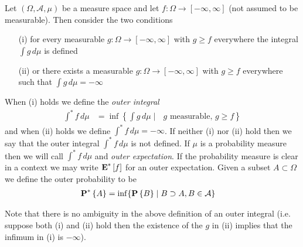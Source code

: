 \begin{defn}Let $(\Omega, \mathcal{A}, \mu)$ be a measure space and let $f : \Omega \to [-\infty, \infty]$ (not assumed to be measurable).  Then consider the two conditions
\begin{itemize}
\item [(i)] for every measurable $g : \Omega \to [-\infty, \infty]$ with $g \geq f$ everywhere the integral $\int g \, d\mu$ is defined 
\item [(ii)] or there exists a measurable $g : \Omega \to [-\infty, \infty]$  with $g \geq f$ everywhere such that $\int g \, d\mu = -\infty$ 
\end{itemize}
When (i) holds we define the \emph{outer integral}
\begin{align*}
\int^* {f} \, d\mu &= \inf \left \lbrace \int g  \, d\mu \mid \text{ $g$ measurable, } g \geq f \right \rbrace
\end{align*}
and when (ii) holds we define $\int^* f \, d\mu = -\infty$.
If neither (i) nor (ii) hold then we say that the outer integral $\int^* f \, d\mu$ is not defined.  If $\mu$ is a probability measure then we will call $\int^* f \, d\mu$ and \emph{outer expectation}.  If the probability measure is clear in a context we may write $\textbf{E}^*\left[f\right]$ for an outer expectation.  Given a subset $A \subset \Omega$ we define the outer probability to be
\begin{align*}
\textbf{P}^* \left \{A \right \} &= \inf \lbrace \textbf{P}\left \{B \right \} \mid B \supset A, B \in \mathcal{A} \rbrace
\end{align*}
\end{defn}

Note that there is no ambiguity in the above definition of an outer integral (i.e. suppose both (i) and (ii) hold then the existence of the $g$ in (ii) implies that the infimum in (i) is $-\infty$).

